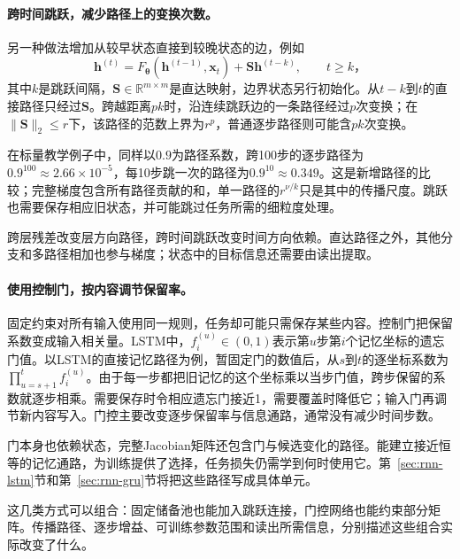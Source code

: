 \paragraph{跨时间跳跃，减少路径上的变换次数。}
\label{sec:rnn-temporal-skips}

另一种做法增加从较早状态直接到较晚状态的边，例如
\begin{equation}
  \bm h^{(t)}=F_{\bm\theta}(\bm h^{(t-1)},\bm x_t)
       +\bm S\bm h^{(t-k)},\qquad t\geq k\text{，}
  \label{eq:rnn-temporal-skip}
\end{equation}
其中$k$是跳跃间隔，$\bm S\in\mathbb R^{m\times m}$是直达映射，边界状态另行初始化。从$t-k$到$t$的直接路径只经过$\bm S$。跨越距离$pk$时，沿连续跳跃边的一条路径经过$p$次变换；在$\lVert\bm S\rVert_2\leq r$下，该路径的范数上界为$r^p$，普通逐步路径则可能含$pk$次变换。

在标量教学例子中，同样以$0.9$为路径系数，跨100步的逐步路径为$0.9^{100}\approx2.66\times10^{-5}$，每10步跳一次的路径为$0.9^{10}\approx0.349$。这是新增路径的比较；完整梯度包含所有路径贡献的和，单一路径的$r^{\nu/k}$只是其中的传播尺度。跳跃也需要保存相应旧状态，并可能跳过任务所需的细粒度处理。

跨层残差改变层方向路径，跨时间跳跃改变时间方向依赖。直达路径之外，其他分支和多路径相加也参与梯度；状态中的目标信息还需要由读出提取。

\paragraph{使用控制门，按内容调节保留率。}
\label{sec:rnn-gated-memory-path}

固定约束对所有输入使用同一规则，任务却可能只需保存某些内容。控制门把保留系数变成输入相关量。LSTM中，$f_i^{(u)}\in(0,1)$表示第$u$步第$i$个记忆坐标的遗忘门值。以LSTM的直接记忆路径为例，暂固定门的数值后，从$s$到$t$的逐坐标系数为$\prod_{u=s+1}^{t}f_i^{(u)}$。由于每一步都把旧记忆的这个坐标乘以当步门值，跨步保留的系数就逐步相乘。需要保存时令相应遗忘门接近1，需要覆盖时降低它；输入门再调节新内容写入。门控主要改变逐步保留率与信息通路，通常没有减少时间步数。

门本身也依赖状态，完整Jacobian矩阵还包含门与候选变化的路径。能建立接近恒等的记忆通路，为训练提供了选择，任务损失仍需学到何时使用它。第~\ref{sec:rnn-lstm}节和第~\ref{sec:rnn-gru}节将把这些路径写成具体单元。

这几类方式可以组合：固定储备池也能加入跳跃连接，门控网络也能约束部分矩阵。传播路径、逐步增益、可训练参数范围和读出所需信息，分别描述这些组合实际改变了什么。


